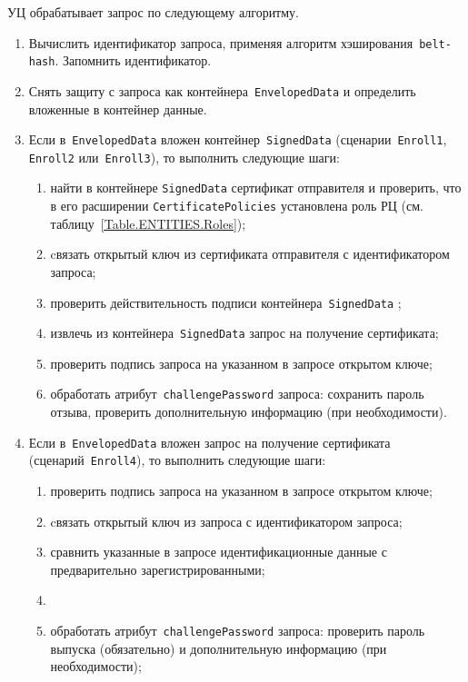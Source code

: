 УЦ обрабатывает запрос по следующему алгоритму.

\begin{enumerate}
\item
Вычислить идентификатор запроса, применяя 
алгоритм хэширования~\texttt{belt-hash}. 
Запомнить идентификатор.

\item
Снять защиту с запроса как контейнера~\texttt{EnvelopedData} 
и определить вложенные в контейнер данные.

\item
Если в~\texttt{EnvelopedData} вложен контейнер~\texttt{SignedData}
(сценарии~\texttt{Enroll1}, \texttt{Enroll2} или~\texttt{Enroll3}), 
то выполнить следующие шаги:

\begin{enumerate}
\item
найти в контейнере \texttt{SignedData} сертификат отправителя
и проверить, что в его расширении \texttt{CertificatePolicies} 
установлена роль РЦ (см. таблицу~\ref{Table.ENTITIES.Roles});
\item
cвязать открытый ключ из сертификата отправителя с идентификатором 
запроса;
\item
проверить действительность подписи контейнера~\texttt{SignedData}
;
\item
извлечь из контейнера~\texttt{SignedData} запрос на получение сертификата;
\item
проверить подпись запроса на указанном в запросе открытом ключе;
\item
обработать атрибут~\texttt{challengePassword} запроса:
сохранить пароль отзыва, проверить дополнительную информацию
(при необходимости).
\end{enumerate}

\item
Если в~\texttt{EnvelopedData} вложен запрос на получение сертификата
(сценарий~\texttt{Enroll4}), то выполнить следующие шаги:
\begin{enumerate}
\item
проверить подпись запроса на указанном в запросе открытом ключе;
\item
cвязать открытый ключ из запроса с идентификатором запроса;
\item
сравнить указанные в запросе идентификационные данные с предварительно
зарегистрированными;
\item
{}
\item
обработать атрибут~\texttt{challengePassword} запроса:
проверить пароль выпуска (обязательно) и  
дополнительную информацию (при необходимости);
\end{enumerate}


\end{enumerate}
